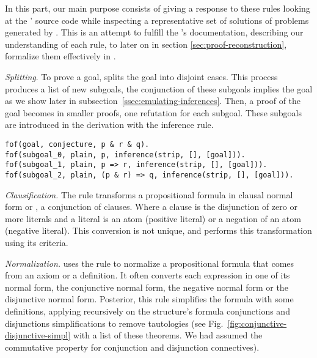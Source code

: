 \documentclass[../main.tex]{subfiles}
\begin{document}

In this part, our main purpose consists of giving a response to
these rules looking at the \Metis' source code while inspecting a
representative set of solutions of \CPL problems
\cite{Prieto-Cubides2017} generated by \Metis.
This is an attempt to fulfill the \Metis's documentation,
describing our understanding of each rule, to later on in section
\ref{sec:proof-reconstruction}, formalize them effectively in \Agda.

\vskip 2mm


\textit{Splitting}. To prove a goal, \Metis splits the goal into
disjoint cases. This process produces a list of new subgoals, the
conjunction of these subgoals implies the goal as we show later in
subsection~\ref{ssec:emulating-inferences}. Then, a proof of the
goal becomes in smaller proofs, one refutation for each subgoal.
These subgoals are introduced in the \TSTP derivation with the \strip
inference rule.

\begin{verbatim}
fof(goal, conjecture, p & r & q).
fof(subgoal_0, plain, p, inference(strip, [], [goal])).
fof(subgoal_1, plain, p => r, inference(strip, [], [goal])).
fof(subgoal_2, plain, (p & r) => q, inference(strip, [], [goal])).
\end{verbatim}


\textit{Clausification.} The \clausify rule transforms a
propositional formula in clausal normal form or \CNF, a conjunction
of clauses. Where a clause is the disjunction of zero or more
literals and a literal is an atom (positive literal) or a negation
of an atom (negative literal). This conversion is not unique, and
\Metis performs this transformation using its criteria.


\textit{Normalization.} \Metis uses the \canonicalize rule to
normalize a propositional formula that comes from an axiom or a
definition. It often converts each expression in one of its normal
form, the conjunctive normal form, the negative normal form or the
disjunctive normal form. Posterior, this rule simplifies the formula
with some definitions, applying recursively on the structure's
formula conjunctions and disjunctions simplifications to remove
tautologies (see Fig.~\ref{fig:conjunctive-disjunctive-simpl} with a
list of these theorems. We had assumed the commutative property for
conjunction and disjunction connectives).
\end{document}
